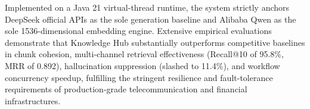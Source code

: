 \begin{abstract*}
    Implemented on a Java 21 virtual-thread runtime, the system strictly anchors DeepSeek official APIs as the sole generation baseline and Alibaba Qwen as the sole 1536-dimensional embedding engine. Extensive empirical evaluations demonstrate that Knowledge Hub substantially outperforms competitive baselines in chunk cohesion, multi-channel retrieval effectiveness (Recall@10 of 95.8\%, MRR of 0.892), hallucination suppression (slashed to 11.4\%), and workflow concurrency speedup, fulfilling the stringent resilience and fault-tolerance requirements of production-grade telecommunication and financial infrastructures.

\end{abstract*}
